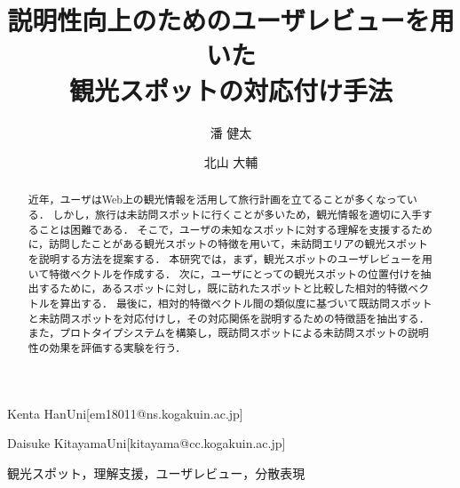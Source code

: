 \documentclass[submit]{ipsj}
\begin{document}
\title{説明性向上のためのユーザレビューを用いた\\観光スポットの対応付け手法}




\author{潘 健太}{Kenta Han}{Uni}[em18011@ns.kogakuin.ac.jp]
\author{北山 大輔}{Daisuke Kitayama}{Uni}[kitayama@cc.kogakuin.ac.jp]

\begin{abstract}
近年，ユーザはWeb上の観光情報を活用して旅行計画を立てることが多くなっている．
しかし，旅行は未訪問スポットに行くことが多いため，観光情報を適切に入手することは困難である．
そこで，ユーザの未知なスポットに対する理解を支援するために，訪問したことがある観光スポットの特徴を用いて，未訪問エリアの観光スポットを説明する方法を提案する．
本研究では，まず，観光スポットのユーザレビューを用いて特徴ベクトルを作成する．
次に，ユーザにとっての観光スポットの位置付けを抽出するために，あるスポットに対し，既に訪れたスポットと比較した相対的特徴ベクトルを算出する．
最後に，相対的特徴ベクトル間の類似度に基づいて既訪問スポットと未訪問スポットを対応付けし，その対応関係を説明するための特徴語を抽出する．
また，プロトタイプシステムを構築し，既訪問スポットによる未訪問スポットの説明性の効果を評価する実験を行う．
\end{abstract}


\begin{jkeyword}
観光スポット，理解支援，ユーザレビュー，分散表現
\end{jkeyword}
\end{document}
